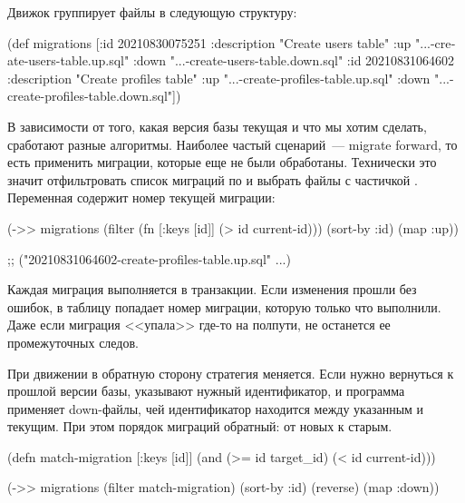 Движок группирует файлы в следующую структуру:

\begin{english}
  \begin{clojure}
(def migrations
  [{:id 20210830075251
    :description "Create users table"
    :up "...-create-users-table.up.sql"
    :down "...-create-users-table.down.sql"}
   {:id 20210831064602
    :description "Create profiles table"
    :up "...-create-profiles-table.up.sql"
    :down "...-create-profiles-table.down.sql"}])
  \end{clojure}
\end{english}

В зависимости от того, какая версия базы текущая и что мы хотим сделать, сработают разные алгоритмы. Наиболее частый сценарий~--- migrate forward, то есть применить миграции, которые еще не были обработаны. Технически это значит отфильтровать список миграций по  и выбрать файлы с частичкой . Переменная   содержит номер текущей миграции:

\begin{english}
  \begin{clojure/lines}
(->> migrations
     (filter (fn [{:keys [id]}]
               (> id current-id)))
     (sort-by :id)
     (map :up))

;; ("20210831064602-create-profiles-table.up.sql" ...)
  \end{clojure/lines}
\end{english}

Каждая миграция выполняется в транзакции. Если изменения прошли без ошибок, в таблицу  попадает номер миграции, которую только что выполнили. Даже если миграция <<упала>> где-то на полпути, не останется ее промежуточных следов.

При движении в обратную сторону стратегия меняется. Если нужно вернуться к прошлой версии базы, указывают нужный идентификатор, и программа применяет down-файлы, чей идентификатор находится между указанным и текущим. При этом порядок миграций обратный: от новых к старым.

\begin{english}
  \begin{clojure}
(defn match-migration
  [{:keys [id]}]
  (and
    (>= id target_id)
    (< id current-id)))

(->> migrations
     (filter match-migration)
     (sort-by :id)
     (reverse)
     (map :down))
  \end{clojure}
\end{english}


